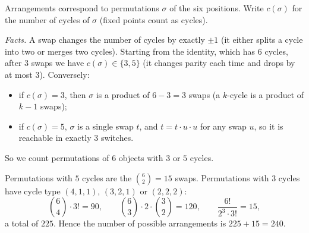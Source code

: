 Arrangements correspond to permutations \(\sigma\) of the six positions. Write \(c(\sigma)\) for the number of cycles of \(\sigma\) (fixed points count as cycles).

\emph{Facts.} A swap changes the number of cycles by exactly \(\pm1\) (it either splits a cycle into two or merges two cycles). Starting from the identity, which has \(6\) cycles, after \(3\) swaps we have \(c(\sigma)\in\{3,5\}\) (it changes parity each time and drops by at most \(3\)). Conversely:
\begin{itemize}
\item if \(c(\sigma)=3\), then \(\sigma\) is a product of \(6-3=3\) swaps (a \(k\)-cycle is a product of \(k-1\) swaps);
\item if \(c(\sigma)=5\), \(\sigma\) is a single swap \(t\), and \(t=t\cdot u\cdot u\) for any swap \(u\), so it is reachable in exactly \(3\) switches.
\end{itemize}
So we count permutations of \(6\) objects with \(3\) or \(5\) cycles.

Permutations with \(5\) cycles are the \(\binom62=15\) swaps. Permutations with \(3\) cycles have cycle type \((4,1,1)\), \((3,2,1)\) or \((2,2,2)\):
\[
\binom64\cdot3!=90,\qquad \binom63\cdot2\cdot\binom32=120,\qquad \dfrac{6!}{2^3\cdot3!}=15,
\]
a total of \(225\). Hence the number of possible arrangements is \(225+15=\boxed{240}\).
